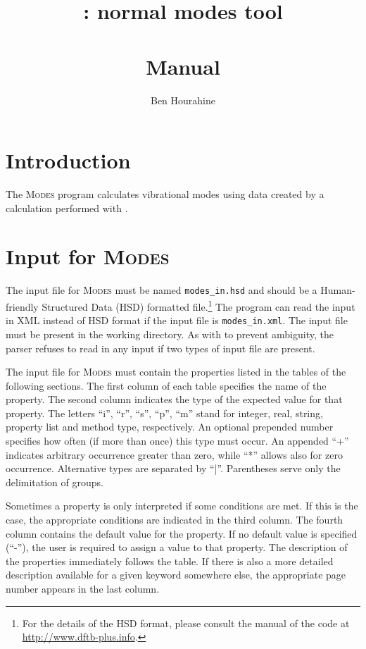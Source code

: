 \documentclass[a4paper,11pt]{report}
\title{\textbf{\modes: normal modes tool\\\ \\Manual}}
\date{}
\author{Ben Hourahine}
\newcommand{\modes}{\textsc{Modes}}
\begin{document}
\maketitle

\setcounter{tocdepth}{1}
\tableofcontents

\setlength{\parindent}{0pt}
\setlength{\parskip}{6pt}

\chapter{Introduction}

The \modes{} program calculates vibrational modes using data created by a
calculation performed with \dftbp{}.

\chapter{Input for \modes}

The input file for \modes{} must be named \verb|modes_in.hsd| and
should be a Human-friendly Structured Data (HSD) formatted
file.\footnote{ For the details of the HSD format, please consult the
  manual of the {\dftbp} code at
  \href{http://www.dftb-plus.info}{http://www.dftb-plus.info}.} The
program can read the input in XML instead of HSD format if the input
file is \verb|modes_in.xml|. The input file must be present in the
working directory. As with {\dftbp} to prevent ambiguity, the parser
refuses to read in any input if two types of input file are present.

The input file for {\modes} must contain the properties listed in
the tables of the following sections. The first column of each table
specifies the name of the property. The second column indicates the
type of the expected value for that property.  The letters ``i'',
``r'', ``s'', ``p'', ``m'' stand for integer, real, string, property
list and method type, respectively. An optional prepended number
specifies how often (if more than once) this type must occur. An
appended ``+'' indicates arbitrary occurrence greater than zero, while
``*'' allows also for zero occurrence.  Alternative types are
separated by ``|''.  Parentheses serve only the delimitation of
groups.

Sometimes a property is only interpreted if some conditions are met.
If this is the case, the appropriate conditions are indicated in the
third column. The fourth column contains the default value for the
property.  If no default value is specified (``-''), the user is
required to assign a value to that property.  The description of the
properties immediately follows the table.  If there is also a more
detailed description available for a given keyword somewhere else, the
appropriate page number appears in the last column.
\end{document}
